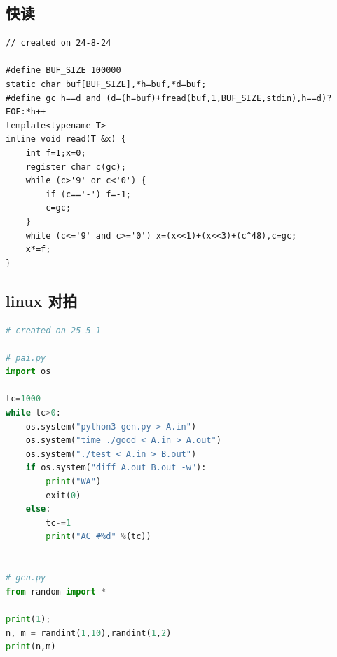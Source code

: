 \documentclass[a4paper,12pt]{article}
\begin{document}
\subsection{快读}

\begin{lstlisting}
// created on 24-8-24

#define BUF_SIZE 100000
static char buf[BUF_SIZE],*h=buf,*d=buf;
#define gc h==d and (d=(h=buf)+fread(buf,1,BUF_SIZE,stdin),h==d)?EOF:*h++
template<typename T>
inline void read(T &x) {
    int f=1;x=0;
    register char c(gc);
    while (c>'9' or c<'0') {
        if (c=='-') f=-1;
        c=gc;
    }
    while (c<='9' and c>='0') x=(x<<1)+(x<<3)+(c^48),c=gc;
    x*=f;
}
\end{lstlisting}

\subsection{linux 对拍}

\begin{lstlisting}[language=Python]
# created on 25-5-1

# pai.py
import os

tc=1000
while tc>0:
    os.system("python3 gen.py > A.in")
    os.system("time ./good < A.in > A.out")
    os.system("./test < A.in > B.out")
    if os.system("diff A.out B.out -w"):
        print("WA")
        exit(0)
    else:
        tc-=1
        print("AC #%d" %(tc))


# gen.py
from random import *

print(1);
n, m = randint(1,10),randint(1,2)
print(n,m)  
\end{lstlisting}

\newpage
\end{document}
